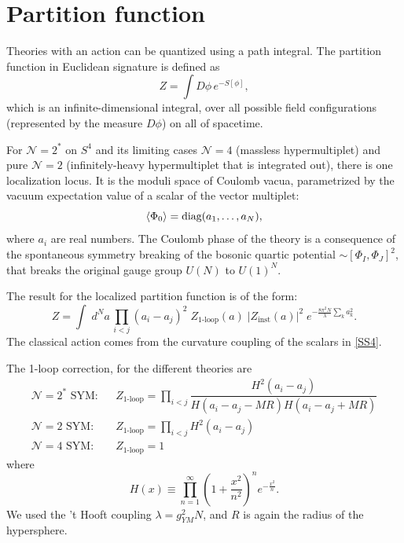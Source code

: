 \section{Partition function}

Theories with an action can be quantized using a path integral.
The partition function in Euclidean signature is defined as
\begin{equation}
 Z = \int D\phi \, e^{-S[\phi]},
\end{equation}
which is an infinite-dimensional integral, 
over all possible field configurations (represented by the measure $D\phi$) on all of spacetime.


For $\mathcal{N}=2^*$ on $S^4$ and its limiting cases $\mathcal{N}=4$ (massless hypermultiplet) and pure $\mathcal{N}=2$ (infinitely-heavy hypermultiplet that is integrated out), 
there is one localization locus.
It is the moduli space of Coulomb vacua, 
parametrized by the vacuum expectation value of a scalar of the vector multiplet:
\begin{equation}\label{vevScalar}
 \braket{\Phi_0} = \text{diag}(a_1, \ldots, a_N), 
\end{equation}
where $a_i$ are real numbers.
The Coulomb phase of the theory 
is a consequence of the spontaneous symmetry breaking of the bosonic quartic potential $\sim [\Phi_I, \Phi_J]^2$,
that breaks the original gauge group $U(N)$ to $U(1)^{N}$.

The result for the localized partition function is of the form:
\begin{equation}\label{Zmatrixmodel}
 Z=\int \; d^N a \, \prod_{i<j} (a_i-a_j)^2 \; Z_\text{1-loop}(a)\; \left|Z_\text{inst}(a)\right|^2\; e^{- \frac{8\pi^2 N}{\lambda} \sum_k a_k^2}.
\end{equation}
The classical action comes from the curvature coupling of the scalars in \eqref{SS4}.

The 1-loop correction, for the different theories are
\begin{eqnarray}
 \text{$\mathcal{N}=2^*$ SYM:}  & & Z_\text{1-loop} = \prod_{i<j} \dfrac{H^2(a_i-a_j)}{H(a_i-a_j-MR) H(a_i-a_j+MR)}\\
 \text{$\mathcal{N}=2$ SYM:}  & & Z_\text{1-loop} = \prod_{i<j} H^2(a_i-a_j) \\
 \text{$\mathcal{N}=4$ SYM:}  & & Z_\text{1-loop} = 1
\end{eqnarray}
where 
\begin{equation}
 H(x) \equiv \prod_{n=1}^{\infty}\left(1+\dfrac{x^2}{n^2}\right)^n e^{-\frac{x^2}{n}}.
\end{equation}
We used the 't Hooft coupling $\lambda = g_{YM}^2 N$,
and $R$ is again the radius of the hypersphere.


